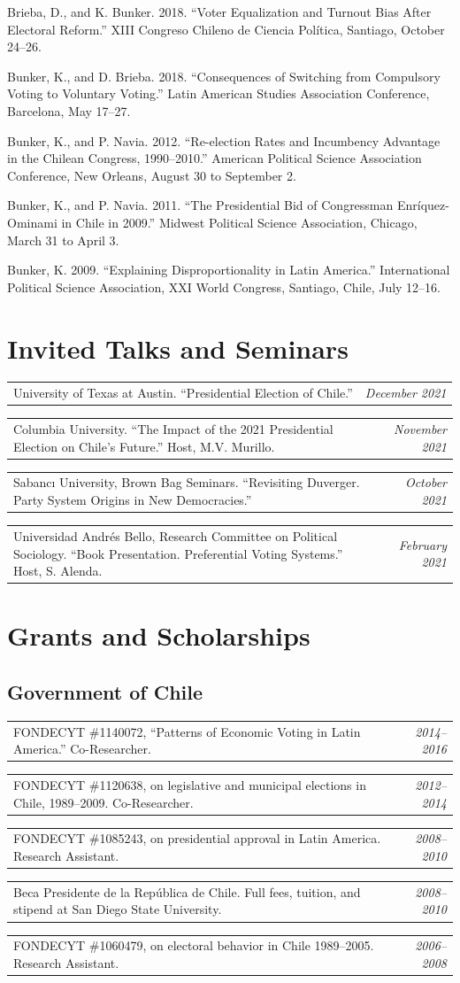 \documentclass[11pt,letterpaper]{article}
\makeatletter
\newif\ifafterhead
\newlength{\entrygap}\setlength{\entrygap}{8.5pt}
\newcommand{\gap}{\ifafterhead\global\afterheadfalse\else\vspace{\entrygap}\fi}
\newcommand{\entry}[1]{\par\gap\hangindent=13pt\hangafter=1\noindent #1\par}
\newcommand{\dated}[2]{\par\gap\noindent\begin{tabularx}{\linewidth}{@{}X@{\hspace{6pt}}r@{}}#1 & \textit{#2}\end{tabularx}\par}
\makeatother
\begin{document}
\entry{Brieba, D., and K. Bunker. 2018. ``Voter Equalization and Turnout Bias After Electoral Reform.'' XIII Congreso Chileno de Ciencia Política, Santiago, October 24--26.}

\entry{Bunker, K., and D. Brieba. 2018. ``Consequences of Switching from Compulsory Voting to Voluntary Voting.'' Latin American Studies Association Conference, Barcelona, May 17--27.}

\entry{Bunker, K., and P. Navia. 2012. ``Re-election Rates and Incumbency Advantage in the Chilean Congress, 1990--2010.'' American Political Science Association Conference, New Orleans, August 30 to September 2.}

\entry{Bunker, K., and P. Navia. 2011. ``The Presidential Bid of Congressman Enríquez-Ominami in Chile in 2009.'' Midwest Political Science Association, Chicago, March 31 to April 3.}

\entry{Bunker, K. 2009. ``Explaining Disproportionality in Latin America.'' International Political Science Association, XXI World Congress, Santiago, Chile, July 12--16.}

\section{Invited Talks and Seminars}
\dated{University of Texas at Austin. ``Presidential Election of Chile.''}{December 2021}
\dated{Columbia University. ``The Impact of the 2021 Presidential Election on Chile's Future.'' Host, M.V. Murillo.}{November 2021}
\dated{Sabanc\i{} University, Brown Bag Seminars. ``Revisiting Duverger. Party System Origins in New Democracies.''}{October 2021}
\dated{Universidad Andrés Bello, Research Committee on Political Sociology. ``Book Presentation. Preferential Voting Systems.'' Host, S. Alenda.}{February 2021}

\section{Grants and Scholarships}
\subsection{Government of Chile}
\dated{FONDECYT \#1140072, ``Patterns of Economic Voting in Latin America.'' Co-Researcher.}{2014--2016}
\dated{FONDECYT \#1120638, on legislative and municipal elections in Chile, 1989--2009. Co-Researcher.}{2012--2014}
\dated{FONDECYT \#1085243, on presidential approval in Latin America. Research Assistant.}{2008--2010}
\dated{Beca Presidente de la República de Chile. Full fees, tuition, and stipend at San Diego State University.}{2008--2010}
\dated{FONDECYT \#1060479, on electoral behavior in Chile 1989--2005. Research Assistant.}{2006--2008}
\end{document}
